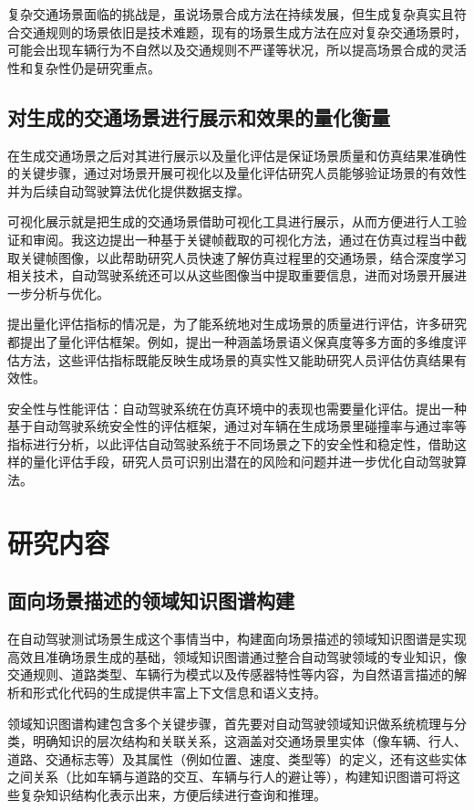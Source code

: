 复杂交通场景面临的挑战是，虽说场景合成方法在持续发展，但生成复杂真实且符合交通规则的场景依旧是技术难题，现有的场景生成方法在应对复杂交通场景时，可能会出现车辆行为不自然以及交通规则不严谨等状况，所以提高场景合成的灵活性和复杂性仍是研究重点。
	
	\subsection{对生成的交通场景进行展示和效果的量化衡量}
	在生成交通场景之后对其进行展示以及量化评估是保证场景质量和仿真结果准确性的关键步骤，通过对场景开展可视化以及量化评估研究人员能够验证场景的有效性并为后续自动驾驶算法优化提供数据支撑。
	
	可视化展示就是把生成的交通场景借助可视化工具进行展示，从而方便进行人工验证和审阅。\cite{Dai et al. (2020)}我这边提出一种基于关键帧截取的可视化方法，通过在仿真过程当中截取关键帧图像，以此帮助研究人员快速了解仿真过程里的交通场景，结合深度学习相关技术，自动驾驶系统还可以从这些图像当中提取重要信息，进而对场景开展进一步分析与优化。
	
提出量化评估指标的情况是，为了能系统地对生成场景的质量进行评估，许多研究都提出了量化评估框架。例如，\cite{Dai et al.(2020)}提出一种涵盖场景语义保真度等多方面的多维度评估方法，这些评估指标既能反映生成场景的真实性又能助研究人员评估仿真结果有效性。
	
	安全性与性能评估：自动驾驶系统在仿真环境中的表现也需要量化评估。\cite{Li et al. (2021)}提出一种基于自动驾驶系统安全性的评估框架，通过对车辆在生成场景里碰撞率与通过率等指标进行分析，以此评估自动驾驶系统于不同场景之下的安全性和稳定性，借助这样的量化评估手段，研究人员可识别出潜在的风险和问题并进一步优化自动驾驶算法。
	
	\section{研究内容}
	\subsection{面向场景描述的领域知识图谱构建}
在自动驾驶测试场景生成这个事情当中，构建面向场景描述的领域知识图谱是实现高效且准确场景生成的基础，领域知识图谱通过整合自动驾驶领域的专业知识\cite{Wang2021advSim}，像交通规则、道路类型、车辆行为模式以及传感器特性等内容，为自然语言描述的解析和形式化代码的生成提供丰富上下文信息和语义支持。
	
领域知识图谱构建包含多个关键步骤\cite{Xu2022Safebench}，首先要对自动驾驶领域知识做系统梳理与分类，明确知识的层次结构和关联关系，这涵盖对交通场景里实体（像车辆、行人、道路、交通标志等）及其属性（例如位置、速度、类型等）的定义，还有这些实体之间关系（比如车辆与道路的交互、车辆与行人的避让等），构建知识图谱可将这些复杂知识结构化表示出来，方便后续进行查询和推理。
	
